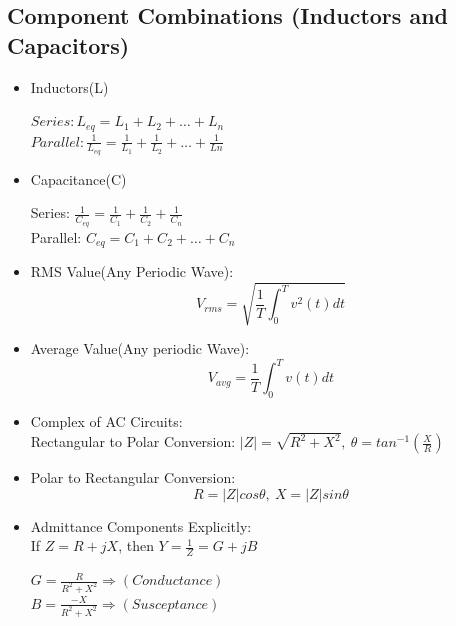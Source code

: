 \documentclass{article}
\begin{document}
\begin{enumerate}
\section{Component Combinations (Inductors and Capacitors)}
\begin{itemize}
    \item Inductors(L) 
    \begin{center}
        $ Series: L_{eq} = L_1 + L_2 + \dots + L_n $ \\
        $ Parallel: \frac{1}{L_{eq}} = \frac{1}{L_1} + \frac{1}{L_2} + \dots + \frac{1}{Ln}$
    \end{center}
    \item Capacitance(C)
    \begin{center}
        Series: $ \frac{1}{C_{eq}} = \frac{1}{C_1} + \frac{1}{C_2} + \frac{1}{C_n}$\\
        Parallel: $ C_{eq} = C_1 + C_2 + \dots + C_n$
    \end{center}
    \item RMS Value(Any Periodic Wave): $$ V_{rms} = \sqrt{{\frac{1}{T}}\int_0^Tv^2(t)dt}$$
    \item Average Value(Any periodic Wave): $$ V_{avg} =\frac{1}{T}\int_0^Tv(t)dt$$
    \item Complex of AC Circuits:\\
    Rectangular to Polar Conversion: 
    $|Z| = \sqrt{R^2 + X^2},\  \theta = tan^{-1}(\frac{X}{R})$
    \item Polar to Rectangular Conversion: $$ R = |Z|cos\theta, \ X = |Z|sin\theta$$
    \item Admittance Components Explicitly:\\
    If $Z = R + jX$, then $ Y = \frac{1}{Z} = G + jB $
    \begin{center}
        $ G = \frac{R}{R^2 + X^2} \Rightarrow (Conductance) $ \\
        $ B = \frac{-X}{R^2 + X^2} \Rightarrow (Susceptance) $
    \end{center}
\end{itemize}

\end{enumerate}
\end{document}

